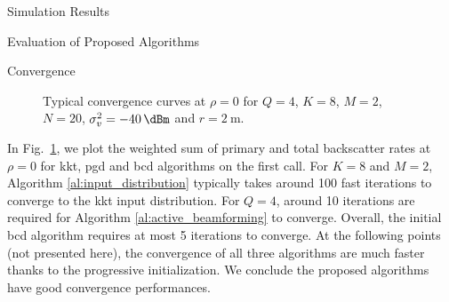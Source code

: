 \documentclass[journal]{IEEEtran}
\begin{document}
\begin{section}{Simulation Results}
\begin{subsection}{Evaluation of Proposed Algorithms}
		\begin{subsubsection}{Convergence}
			\begin{figure}[!t]
				\centering
				\resizebox{0.75\columnwidth}{!}{
					
				}
				\caption{Typical convergence curves at $\rho=0$ for $Q=4$, $K=8$, $M=2$, $N=20$, $\sigma_v^2=\qty{-40}{\dBm}$ and $r=\qty{2}{\meter}$.}
				\label{fg:wsr_convergence}
			\end{figure}

			In Fig.~\ref{fg:wsr_convergence}, we plot the weighted sum of primary and total backscatter rates at $\rho=0$ for \gls{kkt}, \gls{pgd} and \gls{bcd} algorithms on the first call.
			For $K=8$ and $M=2$, Algorithm \ref{al:input_distribution} typically takes around \num{100} fast iterations to converge to the \gls{kkt} input distribution.
			For $Q=4$, around \num{10} iterations are required for Algorithm \ref{al:active_beamforming} to converge.
			Overall, the initial \gls{bcd} algorithm requires at most \num{5} iterations to converge.
			At the following points (not presented here), the convergence of all three algorithms are much faster thanks to the progressive initialization.
			We conclude the proposed algorithms have good convergence performances.
		\end{subsubsection}
	\end{subsection}


\end{section}
\end{document}
